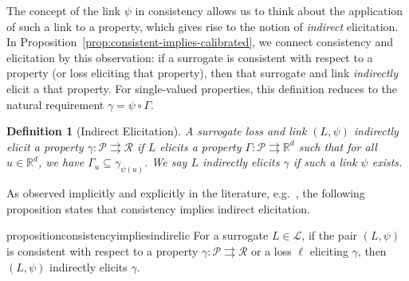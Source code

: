 \documentclass{article} %
\newcommand{\Comments}{0}
\newcommand{\mytodo}[2]{\ifnum\Comments=1%
	\todo[linecolor=#1!80!black,backgroundcolor=#1,bordercolor=#1!80!black]{#2}\fi}
\newcommand{\btw}[1]{}%
\newcommand{\reals}{\mathbb{R}}
\newcommand{\D}{\mathcal{D}}
\renewcommand{\L}{\mathcal{L}}
\newcommand{\R}{\mathcal{R}}
\renewcommand{\P}{\mathcal{P}}
\newcommand{\X}{\mathcal{X}}
\newcommand{\Y}{\mathcal{Y}}
\newcommand{\toto}{\rightrightarrows}
\newtheorem{definition}{Definition}
\begin{document}
The concept of the link $\psi$ in consistency allows us to think about the application of such a link to a property, which gives rise to the notion of \emph{indirect} elicitation.
In Proposition~\ref{prop:consistent-implies-calibrated}, we connect consistency and elicitation by this observation: if a surrogate is consistent with respect to a property (or loss eliciting that property), then that surrogate and link \emph{indirectly} elicit a that property.
For single-valued properties, this definition reduces to the natural requirement $\gamma = \psi \circ \Gamma$.
\begin{definition}[Indirect Elicitation]\label{def:indirectly-elicits}
	A surrogate loss and link $(L, \psi)$ \emph{indirectly elicit} a property $\gamma:\P \toto \R$ if $L$ elicits a property $\Gamma: \P \toto \reals^d$ such that for all $u \in \reals^d$, we have $\Gamma_u \subseteq \gamma_{\psi(u)}$.
	We say $L$ \emph{indirectly elicits} $\gamma$ if such a link $\psi$ exists.
  \btw{interesting discussion of set-valued properties commented out; revive later!}
\end{definition}

As observed implicitly and explicitly in the literature, e.g.~\citep{steinwart2008support,agarwal2015consistent}, the following proposition states that consistency implies indirect elicitation.

\begin{restatable}{proposition}{consistencyimpliesindirelic}\label{thm:consistent-implies-indir-elic}
	For a surrogate $L \in \L$, if the pair $(L, \psi)$ is consistent with respect to a property $\gamma: \P \toto \R$ or a loss $\ell$ eliciting $\gamma$, then $(L, \psi)$ indirectly elicits $\gamma$.
\end{restatable}

\end{document}
